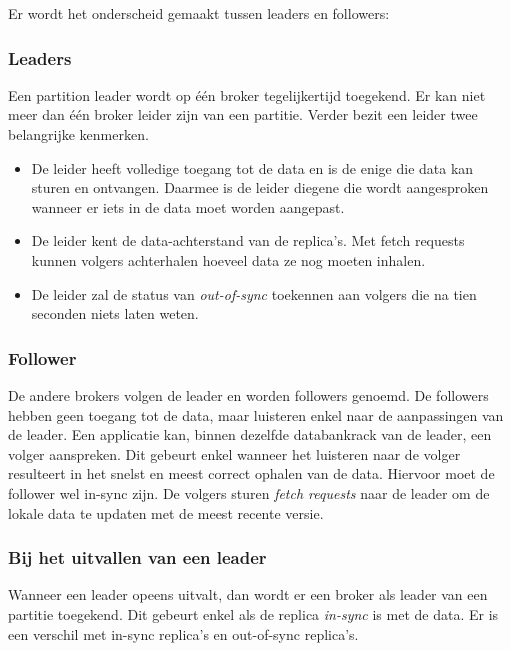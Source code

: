 \documentclass[a4paper,10pt,twoside]{report}
\begin{document}
Er wordt het onderscheid gemaakt tussen leaders en followers:

\subsubsection{Leaders}

Een partition leader wordt op één broker tegelijkertijd toegekend. Er kan niet meer dan één broker leider zijn van een partitie.  Verder bezit een leider twee belangrijke kenmerken.

\begin{itemize}
	\item De leider heeft volledige toegang tot de data en is de enige die data kan sturen en ontvangen. Daarmee is de leider diegene die wordt aangesproken wanneer er iets in de data moet worden aangepast.
	\item De leider kent de data-achterstand van de replica's. Met fetch requests kunnen volgers achterhalen hoeveel data ze nog moeten inhalen.
	\item De leider zal de status van \textit{out-of-sync} toekennen aan volgers die na tien seconden niets laten weten.
\end{itemize}

\subsubsection{Follower}

De andere brokers volgen de leader en worden followers genoemd. De followers hebben geen toegang tot de data, maar luisteren enkel naar de aanpassingen van de leader. Een applicatie kan, binnen dezelfde databankrack van de leader, een volger aanspreken. Dit gebeurt enkel wanneer het luisteren naar de volger resulteert in het snelst en meest correct ophalen van de data. Hiervoor moet de follower wel in-sync zijn. De volgers sturen \textit{fetch requests} naar de leader om de lokale data te updaten met de meest recente versie.

\subsubsection{Bij het uitvallen van een leader}

Wanneer een leader opeens uitvalt, dan wordt er een broker als leader van een partitie toegekend. Dit gebeurt enkel als de replica \textit{in-sync} is met de data. Er is een verschil met in-sync replica's en out-of-sync replica's.
\end{document}
